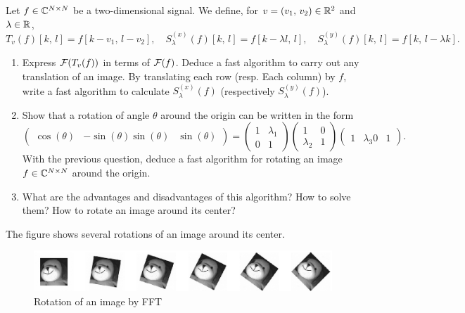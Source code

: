  
\begin{exo}
\label{exo-fft-rotation}
 
Let $ f \in \mathbb{C}^{N \times N} $ be a two-dimensional signal. We define, for $ v = (v_1, \, v_2) \in \mathbb{R}^2 $ and $ \lambda \in \mathbb{R} $,
\begin{equation*}
T_v (f) [k, \, l] = f [k-v_1, \, l-v_2], \quad S_\lambda^{(x)} (f) [k, \, l] = f [k - \lambda l, \, l], \quad S_\lambda^{(y)} (f) [k, \, l] = f [k, \, l- \lambda k].
\end{equation*}
 \begin{enumerate}
\item {}   Express $ \mathcal{F}(T_v (f)) $ in terms of $ \mathcal{F}(f) $. Deduce a fast algorithm to carry out any translation of an image. By translating each row (resp. Each column) by $ f $, write a fast algorithm to calculate $ S_\lambda^{(x)} (f) $ (respectively $ S_\lambda^{(y)} (f) $).
\item Show that a rotation of angle $ \theta $ around the origin can be written in the form
\begin{equation*}
\begin{pmatrix} \cos (\theta) & - \sin (\theta) \sin (\theta) & \sin (\theta) \end{pmatrix} = \begin{pmatrix} 1 & \lambda_1 \\0 & 1 \end{pmatrix} \begin{pmatrix} 1 & 0 \\\lambda_2 & 1 \end{pmatrix} \begin{pmatrix} \\1 & \lambda_3 0 & 1 \end{pmatrix}.
\end{equation*}
With the previous question, deduce a fast algorithm for rotating an image $ f \in \mathbb{C}^{N \times N} $ around the origin.
\item What are the advantages and disadvantages of this algorithm? How to solve them? How to rotate an image around its center?
\end{enumerate} The figure  shows several rotations of an image around its center. \begin{figure}[ht] 
    \begin{center}
    \includegraphics [scale = 0.9]{images/fft-rotation.eps}
    \end{center}
    \caption{Rotation of an image by FFT}
              \label{fig-fft-rotation}
\end{figure}
\end{exo}
 
